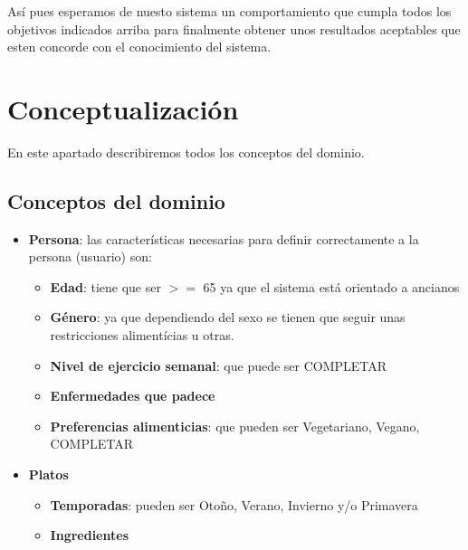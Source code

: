 \documentclass[12]{article}
\begin{document}
Así pues esperamos de nuesto sistema un comportamiento que cumpla todos los objetivos indicados arriba para finalmente obtener unos resultados aceptables que esten concorde con el conocimiento del sistema. 
\section{Conceptualización}
En este apartado describiremos todos los conceptos del dominio. 

\subsection{Conceptos del dominio}
\begin{itemize}
\item \textbf{Persona}: las características necesarias para definir correctamente a la persona (usuario) son: \begin{itemize}
	\item \textbf{Edad}: tiene que ser $>=$ 65 ya que el sistema está orientado a ancianos
	\item \textbf{Género}: ya que dependiendo del sexo se tienen que seguir unas restricciones alimentícias u otras.
	\item \textbf{Nivel de ejercicio semanal}: que puede ser COMPLETAR
	\item \textbf{Enfermedades que padece}
	\item \textbf{Preferencias alimenticias}: que pueden ser Vegetariano, Vegano, COMPLETAR	
	\end{itemize}
	\item \textbf{Platos}
	\begin{itemize}
		\item \textbf{Temporadas}: pueden ser Otoño, Verano, Invierno y/o Primavera
		\item \textbf{Ingredientes}		
	\end{itemize}


\end{itemize}
\end{document}
